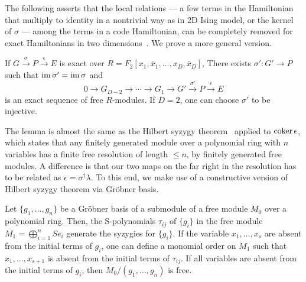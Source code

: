 The following asserts that the local relations --- 
a few terms in the Hamiltonian that multiply to identity in a nontrivial way
as in 2D Ising model, or the kernel of $\sigma$ ---
among the terms in a code Hamiltonian,
can be completely removed for exact Hamiltonians in two dimensions~\cite{Bombin2011Structure}.
We prove a more general version.
\begin{lem}
If $G \xrightarrow{\sigma} P \xrightarrow{\epsilon} E$ is exact
over $R = F_2[ x_1, \bar x_1, \ldots, x_D, \bar x_D ]$,
There exists $\sigma' : G' \to P$ such that $\mathop{\mathrm{im}}\nolimits \sigma' = \mathop{\mathrm{im}}\nolimits \sigma$ and
\[
 0 \to G_{D-2} \to \cdots \to G_1 \to G' \xrightarrow{\sigma'} P \xrightarrow{\epsilon} E
\]
is an exact sequence of free $R$-modules. If $D=2$, one can choose $\sigma'$ to be injective.
\label{lem:coker-epsilon-resolution-length-D}
\end{lem}
\noindent
The lemma is almost the same as the Hilbert syzygy theorem~\cite[Corollary~15.11]{Eisenbud}
applied to $\mathop{\mathrm{coker}}\nolimits \epsilon$,
which states that any finitely generated module over a polynomial ring with $n$ variables
has a finite free resolution of length $\le n$, by finitely generated free modules.
A difference is that our two maps on the far right in the resolution 
has to be related as $\epsilon = \sigma^\dagger \lambda$.
To this end, we make use of a constructive version of Hilbert syzygy theorem via Gr\"obner basis.
\begin{prop}\cite[Theorem~15.10, Corollary~15.11]{Eisenbud}
Let $\{ g_1, \ldots, g_n \}$ be a Gr\"obner basis of a submodule of
a free module $M_0$ over a polynomial ring.
Then, the S-polynomials $\tau_{ij}$ of $\{ g_i \}$
in the free module $M_1 = \bigoplus_{i=1}^n S e_i$
generate the syzygies for $\{g_i\}$.
If the variable $x_1,\ldots, x_s$ are absent from the initial terms of $g_i$,
one can define a monomial order on $M_1$
such that $x_1,\ldots,x_{s+1}$ is absent from
the initial terms of $\tau_{ij}$.
If all variables are absent from the initial terms of $g_i$,
then $M_0/(g_1,\ldots,g_n)$ is free.
\label{prop:constructive-syzygy}
\end{prop}
